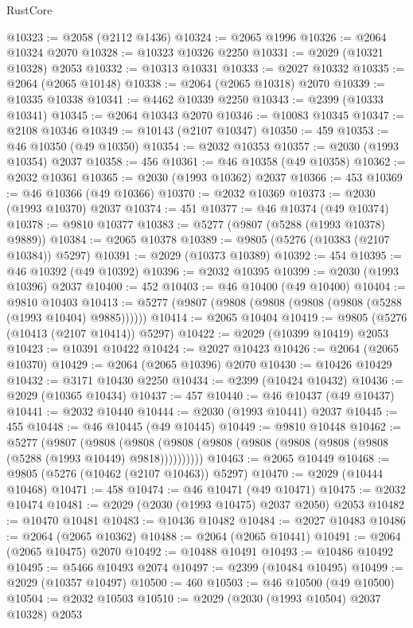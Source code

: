 \begin{lexlean}{RustCore}
\begin{coremodule}
@10323 := @2058 (@2112 @1436)
@10324 := @2065 @1996
@10326 := @2064 @10324 @2070
@10328 := @10323 @10326 @2250
@10331 := @2029 (@10321 @10328) @2053
@10332 := @10313 @10331
@10333 := @2027 @10332
@10335 := @2064 (@2065 @10148)
@10338 := @2064 (@2065 @10318) @2070
@10339 := @10335 @10338
@10341 := @4462 @10339 @2250
@10343 := @2399 (@10333 @10341)
@10345 := @2064 @10343 @2070
@10346 := @10083 @10345
@10347 := @2108 @10346
@10349 := @10143 (@2107 @10347)
@10350 := 459
@10353 := @46 @10350 (@49 @10350)
@10354 := @2032 @10353
@10357 := @2030 (@1993 @10354) @2037
@10358 := 456
@10361 := @46 @10358 (@49 @10358)
@10362 := @2032 @10361
@10365 := @2030 (@1993 @10362) @2037
@10366 := 453
@10369 := @46 @10366 (@49 @10366)
@10370 := @2032 @10369
@10373 := @2030 (@1993 @10370) @2037
@10374 := 451
@10377 := @46 @10374 (@49 @10374)
@10378 := @9810 @10377
@10383 := @5277 (@9807 (@5288 (@1993 @10378) @9889))
@10384 := @2065 @10378
@10389 := @9805 (@5276 (@10383 (@2107 @10384)) @5297)
@10391 := @2029 (@10373 @10389)
@10392 := 454
@10395 := @46 @10392 (@49 @10392)
@10396 := @2032 @10395
@10399 := @2030 (@1993 @10396) @2037
@10400 := 452
@10403 := @46 @10400 (@49 @10400)
@10404 := @9810 @10403
@10413 := @5277 (@9807 (@9808 (@9808 (@9808 (@9808 (@5288 (@1993 @10404) @9885))))))
@10414 := @2065 @10404
@10419 := @9805 (@5276 (@10413 (@2107 @10414)) @5297)
@10422 := @2029 (@10399 @10419) @2053
@10423 := @10391 @10422
@10424 := @2027 @10423
@10426 := @2064 (@2065 @10370)
@10429 := @2064 (@2065 @10396) @2070
@10430 := @10426 @10429
@10432 := @3171 @10430 @2250
@10434 := @2399 (@10424 @10432)
@10436 := @2029 (@10365 @10434)
@10437 := 457
@10440 := @46 @10437 (@49 @10437)
@10441 := @2032 @10440
@10444 := @2030 (@1993 @10441) @2037
@10445 := 455
@10448 := @46 @10445 (@49 @10445)
@10449 := @9810 @10448
@10462 := @5277
    (@9807
      (@9808 (@9808 (@9808 (@9808 (@9808 (@9808 (@9808 (@9808 (@5288 (@1993 @10449) @9818))))))))))
@10463 := @2065 @10449
@10468 := @9805 (@5276 (@10462 (@2107 @10463)) @5297)
@10470 := @2029 (@10444 @10468)
@10471 := 458
@10474 := @46 @10471 (@49 @10471)
@10475 := @2032 @10474
@10481 := @2029 (@2030 (@1993 @10475) @2037 @2050) @2053
@10482 := @10470 @10481
@10483 := @10436 @10482
@10484 := @2027 @10483
@10486 := @2064 (@2065 @10362)
@10488 := @2064 (@2065 @10441)
@10491 := @2064 (@2065 @10475) @2070
@10492 := @10488 @10491
@10493 := @10486 @10492
@10495 := @5466 @10493 @2074
@10497 := @2399 (@10484 @10495)
@10499 := @2029 (@10357 @10497)
@10500 := 460
@10503 := @46 @10500 (@49 @10500)
@10504 := @2032 @10503
@10510 := @2029 (@2030 (@1993 @10504) @2037 @10328) @2053

\end{coremodule}
\end{lexlean}
